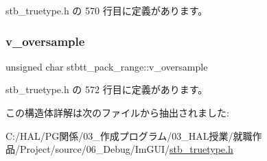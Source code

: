  stb\+\_\+truetype.\+h の 570 行目に定義があります。

\mbox{\label{structstbtt__pack__range_a6288f14006e257544db3d015c32b4113}} 
\subsubsection{\texorpdfstring{v\+\_\+oversample}{v\_oversample}}
{\footnotesize\ttfamily unsigned char stbtt\+\_\+pack\+\_\+range\+::v\+\_\+oversample}



 stb\+\_\+truetype.\+h の 572 行目に定義があります。



この構造体詳解は次のファイルから抽出されました\+:\begin{DoxyCompactItemize}
\item 
C\+:/\+H\+A\+L/\+P\+G関係/03\+\_\+作成プログラム/03\+\_\+\+H\+A\+L授業/就職作品/\+Project/source/06\+\_\+\+Debug/\+Im\+G\+U\+I/\mbox{\hyperlink{stb__truetype_8h}{stb\+\_\+truetype.\+h}}\end{DoxyCompactItemize}
